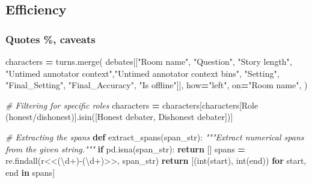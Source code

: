 \documentclass[
]{article}
\newenvironment{Shaded}{\begin{snugshade}}{\end{snugshade}}
\newcommand{\BuiltInTok}[1]{#1}
\newcommand{\CommentTok}[1]{\textcolor[rgb]{0.56,0.35,0.01}{\textit{#1}}}
\newcommand{\ControlFlowTok}[1]{\textcolor[rgb]{0.13,0.29,0.53}{\textbf{#1}}}
\newcommand{\KeywordTok}[1]{\textcolor[rgb]{0.13,0.29,0.53}{\textbf{#1}}}
\newcommand{\NormalTok}[1]{#1}
\newcommand{\OperatorTok}[1]{\textcolor[rgb]{0.81,0.36,0.00}{\textbf{#1}}}
\newcommand{\StringTok}[1]{\textcolor[rgb]{0.31,0.60,0.02}{#1}}
\newcommand{\VerbatimStringTok}[1]{\textcolor[rgb]{0.31,0.60,0.02}{#1}}
\begin{document}
\hypertarget{efficiency}{%
\subsection{Efficiency}\label{efficiency}}

\hypertarget{quotes-caveats}{%
\subsubsection{Quotes \%, caveats}\label{quotes-caveats}}

\begin{Shaded}
\begin{Highlighting}[]
\NormalTok{characters }\OperatorTok{=}\NormalTok{ turns.merge(}
\NormalTok{        debates[[}\StringTok{"Room name"}\NormalTok{, }\StringTok{"Question"}\NormalTok{, }\StringTok{"Story length"}\NormalTok{,}
                 \StringTok{"Untimed annotator context"}\NormalTok{,}\StringTok{"Untimed annotator context bins"}\NormalTok{,}
                 \StringTok{"Setting"}\NormalTok{, }\StringTok{"Final\_Setting"}\NormalTok{, }\StringTok{"Final\_Accuracy"}\NormalTok{,}
                 \StringTok{"Is offline"}\NormalTok{]],}
\NormalTok{        how}\OperatorTok{=}\StringTok{"left"}\NormalTok{,}
\NormalTok{        on}\OperatorTok{=}\StringTok{"Room name"}\NormalTok{,}
\NormalTok{    )}



\CommentTok{\# Filtering for specific roles}
\NormalTok{characters }\OperatorTok{=}\NormalTok{ characters[characters[}\StringTok{\textquotesingle{}Role (honest/dishonest)\textquotesingle{}}\NormalTok{].isin([}\StringTok{\textquotesingle{}Honest debater\textquotesingle{}}\NormalTok{, }\StringTok{\textquotesingle{}Dishonest debater\textquotesingle{}}\NormalTok{])]}

\CommentTok{\# Extracting the spans}
\KeywordTok{def}\NormalTok{ extract\_spans(span\_str):}
    \CommentTok{"""Extract numerical spans from the given string."""}
    \ControlFlowTok{if}\NormalTok{ pd.isna(span\_str):}
        \ControlFlowTok{return}\NormalTok{ []}
\NormalTok{    spans }\OperatorTok{=}\NormalTok{ re.findall(}\VerbatimStringTok{r\textquotesingle{}\textless{}\textless{}(\textbackslash{}d+){-}(\textbackslash{}d+)\textgreater{}\textgreater{}\textquotesingle{}}\NormalTok{, span\_str)}
    \ControlFlowTok{return}\NormalTok{ [(}\BuiltInTok{int}\NormalTok{(start), }\BuiltInTok{int}\NormalTok{(end)) }\ControlFlowTok{for}\NormalTok{ start, end }\KeywordTok{in}\NormalTok{ spans]}


\end{Highlighting}
\end{Shaded}
\end{document}
